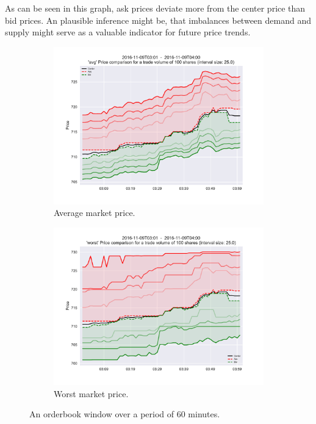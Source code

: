 As can be seen in this graph, ask prices deviate more from the center price than bid prices. An plausible inference might be, that imbalances between demand and supply might serve as a valuable indicator for future price trends.

\begin{figure}[ht]
	\centering
	\begin{subfigure}[t]{0.5\textwidth}
        		\centering
        		\includegraphics[width=\textwidth]{content/drawings/orderbook_window17}
        		\caption{Average market price.}
		\label{fig:orderbookwindow:avg}
    	\end{subfigure}%
	\begin{subfigure}[t]{0.5\textwidth}
        		\centering
        		\includegraphics[width=\textwidth]{content/drawings/orderbook_window17_worst}
        		\caption{Worst market price.}
		\label{fig:orderbookwindow:worst}
    	\end{subfigure}%
	
	\caption{An orderbook window over a period of 60 minutes.}
	\label{fig:orderbookwindow}
\end{figure}

